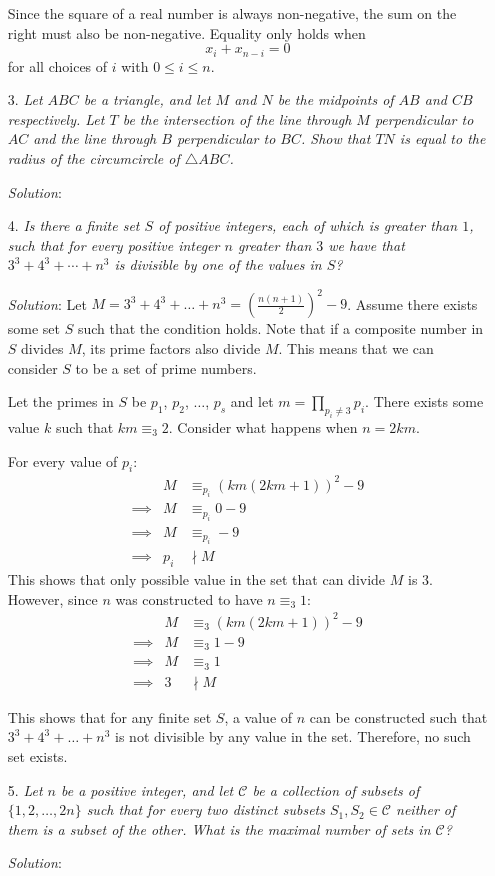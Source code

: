 \documentclass{article}
\begin{document}
\begin{enumerate}
  Since the square of a real number is always non-negative, the sum on the right must also be non-negative. Equality only holds when
  $$x_i + x_{n - i} = 0$$
  for all choices of $i$ with $0 \le i \le n$.
  


\item[3.] %
\textit{Let $ABC$ be a triangle, and let $M$ and $N$ be the midpoints of $AB$ and $CB$ respectively.
Let $T$ be the intersection of the line through $M$ perpendicular to $AC$ and the line through $B$ perpendicular to $BC$.
Show that $TN$ is equal to the radius of the circumcircle of $\triangle ABC$.}

\textit{Solution}:


\item[4.] %
\textit{Is there a finite set $S$ of positive integers, each of which is greater than $1$, such that for every positive integer $n$ greater than $3$ we have that $3^3 +4^3 +\dotsb +n^3$ is divisible by one of the values in $S$?}

\textit{Solution}:
Let $M = 3^3 + 4^3 + \dots + n^3 = (\frac{n(n + 1)}{2})^2 - 9$. Assume there exists some set $S$ such that the condition holds.
Note that if a composite number in $S$ divides $M$, its prime factors also divide $M$. This means that we can consider $S$ to be a set of prime numbers.

Let the primes in $S$ be $p_1$, $p_2$, $\dots$, $p_s$ and let $m = \prod_{p_i \neq 3}p_i$. There exists some value $k$ such that $km \equiv _3 2$. Consider what happens when $n = 2km$.

For every value of $p_i$:
\begin{align*}
  &&M &\equiv _{p_i} (km(2km + 1))^2 - 9 \\
  &\implies& M &\equiv _{p_i} 0 - 9 \\
  &\implies& M &\equiv _{p_i} -9 \\
  &\implies& p_i &\nmid M &
\end{align*}
This shows that only possible value in the set that can divide $M$ is $3$. However, since $n$ was constructed to have $n \equiv _3 1$:
\begin{align*}
  &&M &\equiv _3 (km(2km + 1))^2 - 9 \\
  &\implies& M &\equiv _3 1 - 9 \\
  &\implies& M &\equiv _3 1 \\
  &\implies& 3 &\nmid M &
\end{align*}

This shows that for any finite set $S$, a value of $n$ can be constructed such that $3^3 + 4^3 + \dots + n^3$ is not divisible by any value in the set. Therefore, no such set exists.

\item[5.] %
\textit{\newcommand{\CC}{\mathcal{C}}
Let $n$ be a positive integer, and let $\CC$ be a collection of subsets of $\{1, 2, \dotsc, 2n\}$ such that for every two distinct subsets $S_1, S_2 \in \CC$ neither of them is a subset of the other.
What is the maximal number of sets in $\CC$?}

\textit{Solution}:


\end{enumerate}
\end{document}
